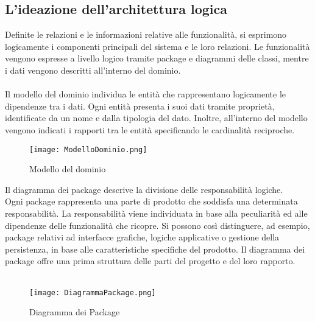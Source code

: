 \clearpage




\subsection{L'ideazione dell'architettura logica}


Definite le relazioni e le informazioni relative alle funzionalità, 
si esprimono logicamente i componenti principali del sistema e le loro relazioni.
Le funzionalità vengono espresse a livello logico tramite package e diagrammi delle classi, 
mentre i dati vengono descritti all'interno del dominio. \\
\\
Il modello del dominio individua le entità che rappresentano logicamente le dipendenze tra i dati.
Ogni entità presenta i suoi dati tramite proprietà, identificate da un nome e dalla tipologia del dato.
Inoltre, all'interno del modello vengono indicati i rapporti tra le entità specificando le cardinalità reciproche.\\

\begin{figure}[h!]
    \begin{center}
        \texttt{[image: ModelloDominio.png]}
        \caption{Modello del dominio}
    \end{center}
\end{figure}
\clearpage


Il diagramma dei package descrive la divisione delle responsabilità logiche.\\
Ogni package rappresenta una parte di prodotto che soddisfa una determinata responsabilità. 
La responsabilità viene individuata in base alla peculiarità ed alle dipendenze delle funzionalità che ricopre.
Si possono così distinguere, ad esempio, package relativi ad interfacce grafiche, logiche applicative o gestione della persistenza, 
in base alle caratteristiche specifiche del prodotto.
Il diagramma dei package offre una prima struttura delle parti del progetto e del loro rapporto.\\
\\

\begin{figure}[h!]
    \begin{center}
        \texttt{[image: DiagrammaPackage.png]}
        \caption{Diagramma dei Package}
    \end{center}
\end{figure}
\clearpage

